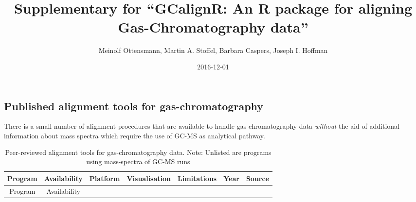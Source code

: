\documentclass[]{article}
\title{Supplementary for ``GCalignR: An R package for aligning
Gas-Chromatography data''}
\author{Meinolf Ottensmann, Martin A. Stoffel, Barbara Caspers, Joseph I.
Hoffman}
\date{2016-12-01}
\begin{document}
\maketitle

\subsection{Published alignment tools for
gas-chromatography}\label{published-alignment-tools-for-gas-chromatography}

There is a small number of alignment procedures that are available to
handle gas-chromatography data \emph{without} the aid of additional
information about mass spectra which require the use of GC-MS as
analytical pathway.

\begin{longtable}[]{@{}ccccccc@{}}
\caption{Peer-reviewed alignment tools for gas-chromatography data.
Note: Unlisted are programs using mass-spectra of GC-MS
runs}\tabularnewline
\toprule
\begin{minipage}[b]{0.10\columnwidth}\centering\strut
Program\strut
\end{minipage} & \begin{minipage}[b]{0.11\columnwidth}\centering\strut
Availability\strut
\end{minipage} & \begin{minipage}[b]{0.08\columnwidth}\centering\strut
Platform\strut
\end{minipage} & \begin{minipage}[b]{0.12\columnwidth}\centering\strut
Visualisation\strut
\end{minipage} & \begin{minipage}[b]{0.22\columnwidth}\centering\strut
Limitations\strut
\end{minipage} & \begin{minipage}[b]{0.05\columnwidth}\centering\strut
Year\strut
\end{minipage} & \begin{minipage}[b]{0.14\columnwidth}\centering\strut
Source\strut
\end{minipage}\tabularnewline
\midrule
\endfirsthead
\toprule
\begin{minipage}[b]{0.10\columnwidth}\centering\strut
Program\strut
\end{minipage} & \begin{minipage}[b]{0.11\columnwidth}\centering\strut
Availability\strut
\end{minipage} & \begin{minipage}[b]{0.08\columnwidth}\centering\strut

\end{minipage}
\end{longtable}
\end{document}
